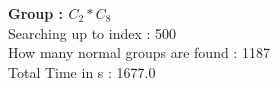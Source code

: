 \textbf{Group : $C_2*C_8$}\\
Searching up to index : 500\\
How many normal groups are found : 1187\\
Total Time in s : 1677.0\\

